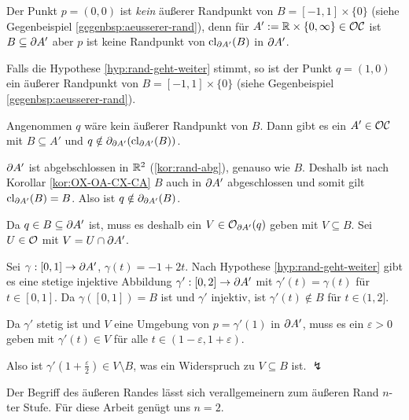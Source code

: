 %    
    \begin{gegenbsp}\label{gegenbsp:aeusserer-rand}
       Der Punkt $p=(0,0)$ ist \textit{kein} äußerer Randpunkt von $B=[-1,1] \times \{0\}$ (siehe Gegenbeispiel \ref{gegenbsp:aeusserer-rand}), denn für $A' := \mathbb{R} \times \{0,\infty\} \in \mathcal{OC}$ ist $B \subseteq \partial A'$ aber $p$ ist keine Randpunkt von $\text{cl}_{\partial A'} (B)$ in $\partial A'$.
    \end{gegenbsp}
%
    \begin{bsp}\label{bsp:aeusserer-rand}
        Falls die Hypothese \ref{hyp:rand-geht-weiter} stimmt, so ist
        der Punkt $q=(1,0)$ ein äußerer Randpunkt von $B=[-1,1] \times \{0\}$ (siehe Gegenbeispiel \ref{gegenbsp:aeusserer-rand}).
    \end{bsp}
%
    \begin{bew}
        Angenommen $q$ wäre kein äußerer Randpunkt von $B$.
        Dann gibt es ein $A' \in \mathcal{OC}$ mit $B \subseteq A'$ und $q \notin \partial_{\partial A'}(\text{cl}_{\partial A'}(B))$.
        
        $\partial A'$ ist abgebschlossen in $\mathbb{R}^2$ (\ref{kor:rand-abg}), genauso wie $B$. Deshalb ist nach Korollar \ref{kor:OX-OA-CX-CA} $B$ auch in $\partial A'$ abgeschlossen und somit gilt $\text{cl}_{\partial A'}(B) = B$.
        Also ist $q \notin \partial_{\partial A'}(B)$.
        
        Da $q \in B \subseteq \partial A'$ ist, muss es deshalb ein $V \in \mathcal{O}_{\partial A'}(q)$ geben mit $V \subseteq B$.
        Sei $U \in \mathcal{O}$ mit $V = U \cap \partial A'$.
        
        Sei $\gamma: [0,1] \to \partial A'$, $\gamma(t) = -1+2t$. 
        Nach Hypothese \ref{hyp:rand-geht-weiter} gibt es eine stetige injektive Abbildung $\gamma': [0,2] \to \partial A'$ mit $\gamma'(t) = \gamma(t)$ für $t \in [0,1]$.
        Da $\gamma([0,1]) = B$ ist und $\gamma'$ injektiv, ist $\gamma'(t) \notin B$ für $t \in (1,2]$.
        
        Da $\gamma'$ stetig ist und $V$ eine Umgebung von $p = \gamma'(1)$ in $\partial A'$, muss es ein $\varepsilon > 0$ geben mit $\gamma'(t) \in V$ für alle $t \in (1-\varepsilon, 1+\varepsilon)$.
        
        Also ist $\gamma'(1+\frac{\varepsilon}{2}) \in V \setminus B$, was ein Widerspruch zu $V \subseteq B$ ist. $\lightning$
    \end{bew}
%
%    
    Der
    Begriff des äußeren Randes lässt sich verallgemeinern zum äußeren Rand $n$-ter Stufe. Für diese Arbeit genügt uns $n = 2$.
%
